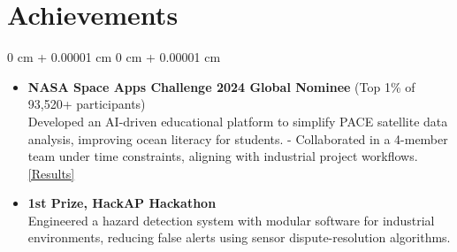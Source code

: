 \documentclass[10pt, letterpaper]{article}
\newenvironment{highlights}{ \begin{itemize}[ topsep=0.10 cm, parsep=0.10 cm, partopsep=0pt,
itemsep=0pt, leftmargin=0 cm + 10pt ] }{ \end{itemize} } %
\newenvironment{onecolentry}{ \begin{adjustwidth}{ 0 cm + 0.00001 cm }{ 0 cm + 0.00001 cm }
}{ \end{adjustwidth} } %
\begin{document}
\section{Achievements}
\begin{onecolentry}
    \begin{highlights}
        \item \textbf{NASA Space Apps Challenge 2024 Global Nominee} (Top 1\% of 93,520+ participants)
        \vspace{0.1cm}
        \\Developed an AI-driven educational platform to simplify PACE satellite data analysis, improving ocean literacy for students. 
        - Collaborated in a 4-member team under time constraints, aligning with industrial project workflows.  
        \href{https://www.spaceappschallenge.org/nasa-space-apps-2024/find-a-team/cosmic-ninjas/}{[Results]}
        
        \item \textbf{1st Prize, HackAP Hackathon}\\\vspace{0.1cm}Engineered a hazard detection system with modular software for industrial environments, reducing false alerts using sensor dispute-resolution algorithms.
    \end{highlights}
\end{onecolentry}
\end{document}
